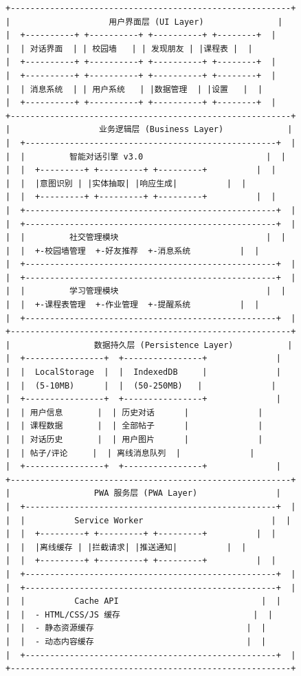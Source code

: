 \documentclass[12pt,a4paper]{article}
\begin{document}
\begin{verbatim}
+---------------------------------------------------------+
|                    用户界面层 (UI Layer)               |
|  +----------+ +----------+ +----------+ +--------+  |
|  | 对话界面  | | 校园墙   | | 发现朋友 | |课程表 |  |
|  +----------+ +----------+ +----------+ +--------+  |
|  +----------+ +----------+ +----------+ +--------+  |
|  | 消息系统  | | 用户系统   | |数据管理  | |设置   |  |
|  +----------+ +----------+ +----------+ +--------+  |
+---------------------------------------------------------+
|                  业务逻辑层 (Business Layer)             |
|  +---------------------------------------------------+  |
|  |         智能对话引擎 v3.0                         |  |
|  |  +---------+ +---------+ +---------+          |  |
|  |  |意图识别 | |实体抽取| |响应生成|          |  |
|  |  +---------+ +---------+ +---------+          |  |
|  +---------------------------------------------------+  |
|  +---------------------------------------------------+  |
|  |         社交管理模块                              |  |
|  |  +-校园墙管理  +-好友推荐  +-消息系统          |  |
|  +---------------------------------------------------+  |
|  +---------------------------------------------------+  |
|  |         学习管理模块                              |  |
|  |  +-课程表管理  +-作业管理  +-提醒系统          |  |
|  +---------------------------------------------------+  |
+---------------------------------------------------------+
|                 数据持久层 (Persistence Layer)           |
|  +----------------+  +----------------+              |
|  |  LocalStorage  |  |  IndexedDB     |              |
|  |  (5-10MB)      |  |  (50-250MB)   |              |
|  +----------------+  +----------------+              |
|  | 用户信息       |  | 历史对话      |              |
|  | 课程数据       |  | 全部帖子      |              |
|  | 对话历史       |  | 用户图片      |              |
|  | 帖子/评论     |  | 离线消息队列  |              |
|  +----------------+  +----------------+              |
+---------------------------------------------------------+
|                 PWA 服务层 (PWA Layer)                |
|  +---------------------------------------------------+  |
|  |          Service Worker                          |  |
|  |  +---------+ +---------+ +---------+          |  |
|  |  |离线缓存 | |拦截请求| |推送通知|          |  |
|  |  +---------+ +---------+ +---------+          |  |
|  +---------------------------------------------------+  |
|  +---------------------------------------------------+  |
|  |          Cache API                             |  |
|  |  - HTML/CSS/JS 缓存                           |  |
|  |  - 静态资源缓存                               |  |
|  |  - 动态内容缓存                               |  |
|  +---------------------------------------------------+  |
+---------------------------------------------------------+
\end{verbatim}
\end{document}
